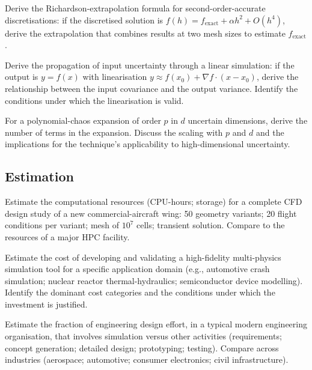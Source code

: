 \begin{exercise}
Derive the Richardson-extrapolation formula for second-order-accurate discretisations: if the discretised solution is $f(h) = f_{\text{exact}} + \alpha h^2 + O(h^4)$, derive the extrapolation that combines results at two mesh sizes to estimate $f_{\text{exact}}$.
\end{exercise}

\begin{exercise}
Derive the propagation of input uncertainty through a linear simulation: if the output is $y = f(x)$ with linearisation $y \approx f(x_0) + \nabla f \cdot (x - x_0)$, derive the relationship between the input covariance and the output variance. Identify the conditions under which the linearisation is valid.
\end{exercise}

\begin{exercise}
For a polynomial-chaos expansion of order $p$ in $d$ uncertain dimensions, derive the number of terms in the expansion. Discuss the scaling with $p$ and $d$ and the implications for the technique's applicability to high-dimensional uncertainty.
\end{exercise}

\subsection*{Estimation}

\begin{exercise}
Estimate the computational resources (CPU-hours; storage) for a complete CFD design study of a new commercial-aircraft wing: 50 geometry variants; 20 flight conditions per variant; mesh of $10^7$ cells; transient solution. Compare to the resources of a major HPC facility.
\end{exercise}

\begin{exercise}
Estimate the cost of developing and validating a high-fidelity multi-physics simulation tool for a specific application domain (e.g., automotive crash simulation; nuclear reactor thermal-hydraulics; semiconductor device modelling). Identify the dominant cost categories and the conditions under which the investment is justified.
\end{exercise}

\begin{exercise}
Estimate the fraction of engineering design effort, in a typical modern engineering organisation, that involves simulation versus other activities (requirements; concept generation; detailed design; prototyping; testing). Compare across industries (aerospace; automotive; consumer electronics; civil infrastructure).
\end{exercise}

